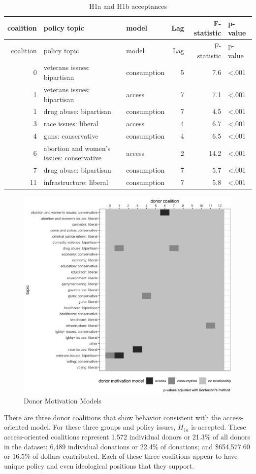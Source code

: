 \documentclass[12pt,]{article}
\begin{document}
\begin{longtable}[]{@{}rllrrl@{}}
\caption{H1a and H1b acceptances}\tabularnewline
\toprule
coalition & policy topic & model & Lag & F-statistic &
p-value\tabularnewline
\midrule
\endfirsthead
\toprule
coalition & policy topic & model & Lag & F-statistic &
p-value\tabularnewline
\midrule
\endhead
0 & veterans issues: bipartisan & consumption & 5 & 7.6 &
\textless.001\tabularnewline
1 & veterans issues: bipartisan & access & 7 & 7.1 &
\textless.001\tabularnewline
1 & drug abuse: bipartisan & consumption & 7 & 4.5 &
\textless.001\tabularnewline
3 & race issues: liberal & access & 4 & 6.7 &
\textless.001\tabularnewline
4 & guns: conservative & consumption & 4 & 6.5 &
\textless.001\tabularnewline
6 & abortion and women's issues: conservative & access & 2 & 14.2 &
\textless.001\tabularnewline
7 & drug abuse: bipartisan & consumption & 7 & 5.7 &
\textless.001\tabularnewline
11 & infrastructure: liberal & consumption & 7 & 5.8 &
\textless.001\tabularnewline
\bottomrule
\end{longtable}

\begin{figure}
\centering
\includegraphics{../tables_and_figures/fig_2.jpg}
\caption{Donor Motivation Models}
\end{figure}

There are three donor coalitions that show behavior consistent with the
access-oriented model. For these three groups and policy issues,
\(H_{1a}\) is accepted. These access-oriented coalitions represent 1,572
individual donors or 21.3\% of all donors in the dataset; 6,489
individual donations or 22.4\% of donations; and \$654,577.60 or 16.5\%
of dollars contributed. Each of these three coalitions appear to have
unique policy and even ideological positions that they support.
\end{document}
